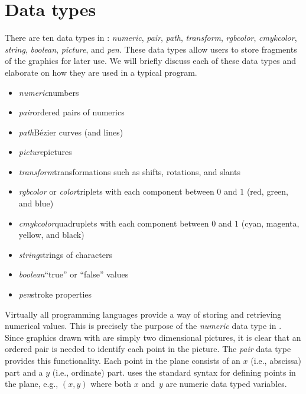 \section{Data types}
\label{sec:datatypes}

There are ten data types in \MP{}: \textit{numeric}, \textit{pair},
\textit{path}, \textit{transform}, \textit{rgbcolor},
\textit{cmykcolor}, \textit{string}, \textit{boolean}, \textit{picture},
and \textit{pen}.  These data types allow users to store fragments of
the graphics for later use.  We will briefly discuss each of these data
types and elaborate on how they are used in a typical \MP{} program.

\renewcommand{\labelitemi}{$\diamond$}
\begin{itemize}
\item \textit{numeric}\Dash numbers
\item \textit{pair}\Dash ordered pairs of numerics
\item \textit{path}\Dash B\'{e}zier curves (and lines)
\item \textit{picture}\Dash pictures
\item \textit{transform}\Dash transformations such as shifts, rotations,
  and slants
\item \textit{rgbcolor} or \textit{color}\Dash triplets with each
  component between $0$ and $1$ (red, green, and blue)
\item \textit{cmykcolor}\Dash quadruplets with each component between
  $0$ and $1$ (cyan, magenta, yellow, and black)
\item \textit{string}\Dash strings of characters
\item \textit{boolean}\Dash ``true'' or ``false'' values
\item \textit{pen}\Dash stroke properties
\end{itemize}

Virtually all programming languages provide a way of storing and
retrieving numerical values.  This is precisely the purpose of the
\textit{numeric} data type in \MP.  Since graphics drawn with \MP{} are
simply two dimensional pictures, it is clear that an ordered pair is
needed to identify each point in the picture.  The \textit{pair} data
type provides this functionality.  Each point in the plane consists of
an $x$ (i.e., abscissa) part and a $y$ (i.e., ordinate) part.  \MP{}
uses the standard syntax for defining points in the plane, e.g., $(x,y)$
where both $x$ and~$y$ are numeric data typed variables.

